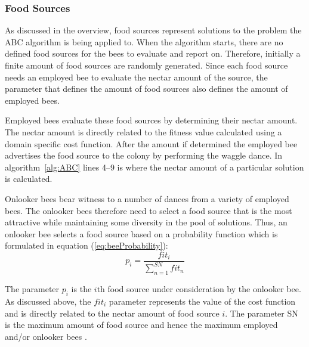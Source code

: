 \subsubsection{Food Sources}
\label{sec:foodsources}
As discussed in the overview, food sources represent solutions to the problem the ABC algorithm is being applied to. When the algorithm starts, there are no defined food sources for the bees to evaluate and report on. Therefore, initially a finite amount of food sources are randomly generated\cite{BeeJobShop,ABCCompareStudy,ABCFusionGrid,ABCNumericalOptimization,ABCImageEnhancement,ABCReconfigDistro}. Since each food source needs an employed bee to evaluate the nectar amount of the source, the parameter that defines the amount of food sources also defines the amount of employed bees\cite{ABCCompareStudy,ABCLeafConstrained,ABCNumericalOptimization,ABCImageEnhancement}.

Employed bees evaluate these food sources by determining their nectar amount\cite{ABCCompareStudy,ABCLeafConstrained,ABCNumericalOptimization,ABCImageEnhancement}. The nectar amount is directly related to the fitness value calculated using a domain specific cost function\cite{ABCCompareStudy,ABCLeafConstrained,ABCReconfigDistro}. After the amount if determined the employed bee advertises the food source to the colony by performing the waggle dance. In algorithm~\ref{alg:ABC} lines 4--9 is where the nectar amount of a particular solution is calculated.

Onlooker bees bear witness to a number of dances from a variety of employed bees\cite{ABCFusionGrid,BeeJobShop,ABCNumericalOptimization,ABCImageEnhancement,ABCReconfigDistro}. The onlooker bees therefore need to select a food source that is the most attractive while maintaining some diversity in the pool of solutions. Thus, an onlooker bee selects a food source based on a probability function which is formulated in equation (\ref{eq:beeProbability})\cite{ABCCompareStudy}:
\begin{equation}
\label{eq:beeProbability}
p_i = \frac{{fit}_i}{\sum^{SN}_{n=1}{fit}_n}
\end{equation}

The parameter $p_i$ is the $i$th food source under consideration by the onlooker bee. As discussed above, the ${fit}_i$ parameter represents the value of the cost function and is directly related to the nectar amount of food source $i$. The parameter SN is the maximum amount of food source and hence the maximum employed and/or onlooker bees \cite{ABCCompareStudy}.

